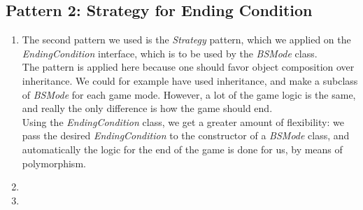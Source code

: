 \documentclass[a4paper,11pt]{article}
\begin{document}
\subsection{Pattern 2: Strategy for Ending Condition}
\begin{enumerate}
\item The second pattern we used is the \textit{Strategy} pattern, which we applied on the \textit{EndingCondition} interface, which is to be used by the \textit{BSMode} class. \\
The pattern is applied here because one should favor object composition over inheritance. We could for example have used inheritance, and make a subclass of \textit{BSMode} for each game mode. However, a lot of the game logic is the same, and really the only difference is how the  game should end.\\
Using the \textit{EndingCondition} class, we get a greater amount of flexibility: we pass the desired \textit{EndingCondition} to the constructor of a \textit{BSMode} class, and automatically the logic for the end of the game is done for us, by means of polymorphism.\\
\item
\item
\end{enumerate}

\end{document}
